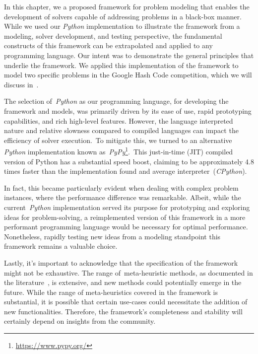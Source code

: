 In this chapter, we a proposed framework for problem modeling that enables the
development of solvers capable of addressing problems in a black-box manner.
While we used our \emph{Python} implementation to illustrate the framework from
a modeling, solver development, and testing perspective, the fundamental
constructs of this framework can be extrapolated and applied to any programming
language. Our intent was to demonstrate the general principles that underlie the
framework. We applied this implementation of the framework to model two specific
problems in the Google Hash Code competition, which we will discuss
in~.

The selection of~\emph{Python} as our programming language, for developing the
framework and models, was primarily driven by its ease of use, rapid prototyping
capabilities, and rich high-level features. However, the language interpreted
nature and relative slowness compared to compiled languages can impact the
efficiency of solver execution.~To mitigate this, we turned to an alternative
\emph{Python} implementation known as~\emph{PyPy}\footnote{\url{https://www.pypy.org/}}.~This just-in-time (JIT) compiled
version of Python has a substantial speed boost, claiming to be approximately
4.8 times faster than the implementation found and average interpreter~(\emph{CPython}).

In fact, this became particularly evident when dealing with complex problem
instances, where the performance difference was remarkable.  Albeit, while the
current~\emph{Python} implementation served its purpose for prototyping and
exploring ideas for problem-solving, a reimplemented version of this framework
in a more performant programming language would be necessary for optimal
performance. Nonetheless, rapidly testing new ideas from a modeling standpoint
this framework remains a valuable choice.

Lastly, it's important to acknowledge that the specification of the framework
might not be exhaustive. The range of~\acrshort{meta-heuristic} methods, as
documented in the literature~\cite{osman1996metaheuristics}, is extensive, and
new methods could potentially emerge in the future. While the range of
meta-heuristics covered in the framework is substantial, it is possible that
certain use-cases could necessitate the addition of new functionalities.
Therefore, the framework's completeness and stability will certainly depend on
insights from the community.